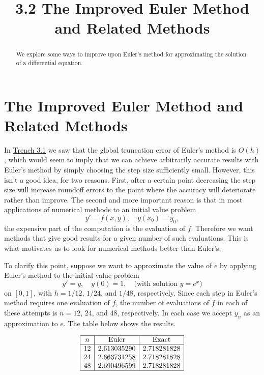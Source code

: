 \documentclass{ximera}
\title{3.2 The Improved Euler Method and Related Methods}%
\begin{document}
\begin{abstract}
We explore some ways to improve upon Euler's method for approximating the solution of a differential equation.
\end{abstract}

\maketitle

\section*{The Improved Euler Method and Related Methods}

In \href{https://ximera.osu.edu/ode/main/eulersMethod/eulersMethod}{Trench 3.1} we saw that the global truncation error of
Euler's method is $O(h)$, which would seem to imply that we can
achieve arbitrarily accurate results with Euler's method by simply
choosing the step size sufficiently small. However, this
isn't  a good idea, for two reasons. First,
after a certain point decreasing the step size will
increase roundoff errors to the point where the accuracy
will deteriorate rather than improve.
 The second
and more important reason is that in most applications of numerical
methods to an initial value problem
\begin{equation} \label{eq:3.2.1}
y'=f(x,y),\quad y(x_0)=y_0,
\end{equation}
the expensive part of the computation is the evaluation of $f$.
Therefore we want methods that give good results for a given number
of such evaluations. This is what motivates us to look for numerical
methods better than Euler's.

To clarify this point, suppose  we want to approximate the value of $e$
by applying Euler's method to the initial value problem
$$
y'=y,\quad y(0)=1,\quad\mbox{(with solution $y=e^x$)}
$$
on $[0,1]$, with $h=1/12$, $1/24$, and $1/48$, respectively. Since
each step in Euler's method requires one evaluation of $f$, the number
of evaluations of $f$ in each of these attempts is $n=12$, $24$, and
$48$, respectively. In each case we accept $y_n$ as an approximation
to $e$.  The table below shows the results. 


$$
\begin{array}{|c|c|c|}
\hline
n&
\text{Euler}&
\text{Exact}\\ \hline
12 & 2.613035290  & 2.718281828 \\
24 & 2.663731258   & 2.718281828 \\
48 & 2.690496599  & 2.718281828
\\
\hline
\end{array}
$$
\end{document}
